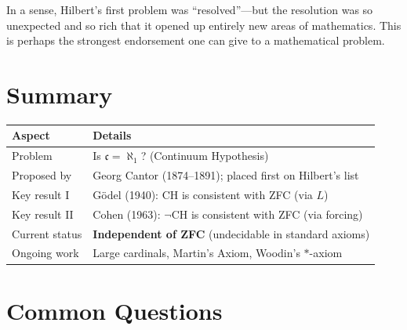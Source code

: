 In a sense, Hilbert's first problem was ``resolved''---but the resolution was so unexpected and so rich that it opened up entirely new areas of mathematics. This is perhaps the strongest endorsement one can give to a mathematical problem.

\section{Summary}

\begin{center}
\renewcommand{\arraystretch}{1.3}
\begin{tabular}{ll}
\toprule
\textbf{Aspect} & \textbf{Details} \\
\midrule
Problem & Is $\mathfrak{c} = \aleph_1$? (Continuum Hypothesis) \\
Proposed by & Georg Cantor (1874--1891); placed first on Hilbert's list \\
Key result I & G\"odel (1940): CH is consistent with ZFC (via $L$) \\
Key result II & Cohen (1963): $\neg$CH is consistent with ZFC (via forcing) \\
Current status & \textbf{Independent of ZFC} (undecidable in standard axioms) \\
Ongoing work & Large cardinals, Martin's Axiom, Woodin's $\ast$-axiom \\
\bottomrule
\end{tabular}
\end{center}

\section*{Common Questions}

